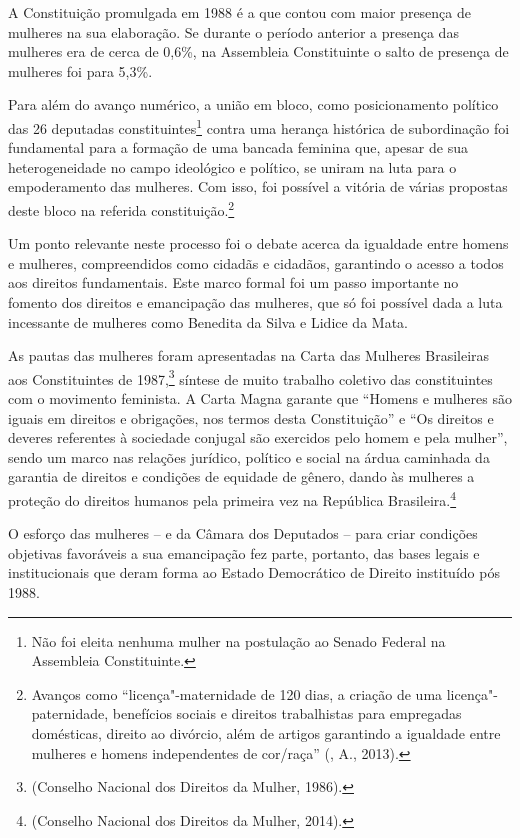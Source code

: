 A Constituição promulgada em 1988 é a que contou com maior presença de
mulheres na sua elaboração. Se durante o período anterior a presença das
mulheres era de cerca de 0,6\%, na Assembleia Constituinte o salto de
presença de mulheres foi para 5,3\%.

Para além do avanço numérico, a união em bloco, como posicionamento
político das 26 deputadas constituintes\footnote{Não foi eleita nenhuma
  mulher na postulação ao Senado Federal na Assembleia Constituinte.}
contra uma herança histórica de subordinação foi fundamental para a
formação de uma bancada feminina que, apesar de sua heterogeneidade no
campo ideológico e político, se uniram na luta para o empoderamento das
mulheres. Com isso, foi possível a vitória de várias propostas deste
bloco na referida constituição.\footnote{Avanços como
  ``licença"-maternidade de 120 dias, a criação de uma
  licença"-paternidade, benefícios sociais e direitos trabalhistas para
  empregadas domésticas, direito ao divórcio, além de artigos garantindo
  a igualdade entre mulheres e homens independentes de cor/raça''
  (, A., 2013).}

Um ponto relevante neste processo foi o debate acerca da igualdade entre
homens e mulheres, compreendidos como cidadãs e cidadãos, garantindo o
acesso a todos aos direitos fundamentais. Este marco formal foi um passo
importante no fomento dos direitos e emancipação das mulheres, que só
foi possível dada a luta incessante de mulheres como Benedita da Silva e
Lidice da Mata.

As pautas das mulheres foram apresentadas na Carta das Mulheres
Brasileiras aos Constituintes de 1987,\footnote{(Conselho Nacional dos
  Direitos da Mulher, 1986).} síntese de muito trabalho coletivo
das constituintes com o movimento feminista. A Carta Magna garante que
``Homens e mulheres são iguais em direitos e obrigações, nos
termos desta Constituição'' e ``Os direitos e deveres referentes à
sociedade conjugal são exercidos pelo homem e pela mulher'', sendo um
marco nas relações jurídico, político e social na árdua caminhada da
garantia de direitos e condições de equidade de gênero, dando às
mulheres a proteção do direitos humanos pela primeira vez na República
Brasileira.\footnote{(Conselho Nacional dos Direitos da Mulher, 2014).}

O esforço das mulheres -- e da Câmara dos Deputados -- para criar
condições objetivas favoráveis a sua emancipação fez parte, portanto,
das bases legais e institucionais que deram forma ao Estado Democrático
de Direito instituído pós 1988.

